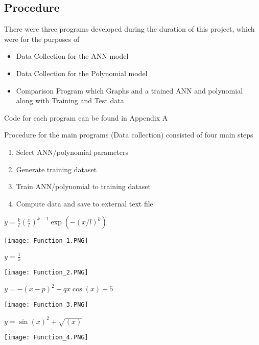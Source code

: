 \documentclass{article}
\begin{document}
\subsection{Procedure}
There were three programs developed during the duration of this project, which were for the purposes of 
\begin{itemize}
    \item Data Collection for the ANN model
    \item Data Collection for the Polynomial model
    \item Comparison Program which Graphs and a trained ANN and polynomial along with Training and Test data
\end{itemize}

Code for each program can be found in Appendix A

Procedure for the main programs (Data collection) consisted of four main steps

\begin{enumerate}
    \item Select ANN/polynomial parameters
    \item Generate training dataset
    \item Train ANN/polynomial to training dataset
    \item Compute data and save to external text file
\end{enumerate}

\Large

\begin{center}
    $y=\frac{k}{l}\left(\frac{x}{l} \right)^{k-1}\exp{(-(x/l)^k)}$
\end{center}
\vspace{-0.6cm}
\begin{center}
    \texttt{[image: Function\_1.PNG]}
\end{center}
\Large
\begin{center}
    $y=\frac{1}{x}$
\end{center}
\vspace{-0.5cm}
\begin{center}
    \texttt{[image: Function\_2.PNG]}
\end{center}
\newpage

\Large
\begin{center}
    $y=-(x-p)^2+qx\cos{(x)}+5$
\end{center}
\vspace{-0.5cm}
\begin{center}
    \texttt{[image: Function\_3.PNG]}
\end{center}
\Large
\begin{center}
    $y=\sin{(x)}^2+\sqrt{(x)}$
\end{center}
\vspace{-0.6cm}
\begin{center}
    \texttt{[image: Function\_4.PNG]}
\end{center}
\newpage
\end{document}
